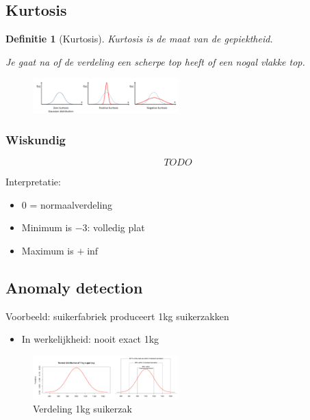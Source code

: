 \documentclass{article}
\newtheorem{theorem}{Definitie}[section]
\begin{document}
\subsection{Kurtosis}

\begin{theorem}[Kurtosis]
    Kurtosis is de maat van de gepiektheid. 

    Je gaat na of de verdeling een scherpe top heeft of een nogal vlakke top.
\end{theorem}

\begin{figure}[H]
    \centering
    \includegraphics[width=0.5\textwidth]{kurtosis.png}
\end{figure}

\subsubsection{Wiskundig}

\begin{equation}
    TODO    
\end{equation}



Interpretatie:

\begin{itemize}
    \item $0$ = normaalverdeling
    \item Minimum is $-3$: volledig plat
    \item Maximum is $+\inf$
\end{itemize}


\subsection{Anomaly detection}

Voorbeeld: suikerfabriek produceert 1kg suikerzakken

\begin{itemize}
    \item In werkelijkheid: nooit exact 1kg
\end{itemize}

\begin{figure}[H]
    \centering
    \includegraphics[width=0.5\textwidth]{anomaly-detection.png}
    \caption{Verdeling 1kg suikerzak}
\end{figure}
\end{document}
